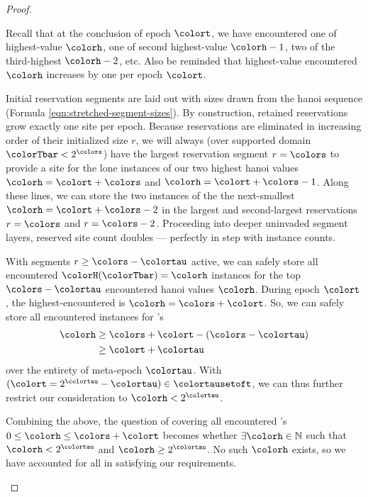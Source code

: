 \begin{proof}
\begin{proofpart}
Recall that at the conclusion of epoch $\colort$, we have encountered one of highest-value \hv{} $\colorh$, one of second highest-value \hv{} $\colorh-1$, two of the third-highest \hv{} $\colorh-2$, etc.
Also be reminded that highest-value encountered \hv{} $\colorh$ increases by one per epoch $\colort$.

Initial reservation segments are laid out with sizes drawn from the hanoi sequence (Formula \ref{eqn:stretched-segment-sizes}).
By construction, retained reservations grow exactly one site per epoch.
Because reservations are eliminated in increasing order of their initialized size $r$, we will always (over supported domain $\colorTbar < 2^{\colors}$) have the largest reservation segment $r=\colors$ to provide a site for the lone instances of our two highest hanoi values $\colorh=\colort+\colors$ and $\colorh=\colort+\colors-1$.
Along these lines, we can store the two instances of the the next-smallest \hv{} $\colorh=\colort+\colors-2$ in the largest and second-largest reservations $r=\colors$ and $r=\colors-2$.
Proceeding into deeper uninvaded segment layers, reserved site count doubles --- perfectly in step with \hv{} instance counts.

With segments $r \geq \colors - \colortau$ active, we can safely store all encountered \hv{} $\colorH(\colorTbar) = \colorh$ instances for the top $\colors - \colortau$ encountered hanoi values $\colorh$.
During epoch $\colort$, the highest-encountered \hv{} is $\colorh=\colors + \colort$.
So, we can safely store all encountered instances for \hv{}'s
\begin{align*}
\colorh
&\geq
\colors + \colort - (\colors - \colortau)\\
&\geq
\colort + \colortau
\end{align*}
over the entirety of meta-epoch $\colortau$.
With $(\colort = 2^{\colortau} - \colortau) \in \colortausetoft$, we can thus further restrict our consideration to $\colorh < 2^{\colortau}$.
\end{proofpart}

\begin{proofpart}
Combining the above, the question of covering all encountered \hv{}'s $0\leq\colorh\leq\colors+\colort$ becomes whether $\exists \colorh \in \mathbb{N}$ such that $\colorh < 2^{\colortau}$ and $\colorh \geq 2^{\colortau}$.
No such $\colorh$ exists, so we have accounted for all \hv{} in satisfying our requirements.
\end{proofpart}

\end{proof}
